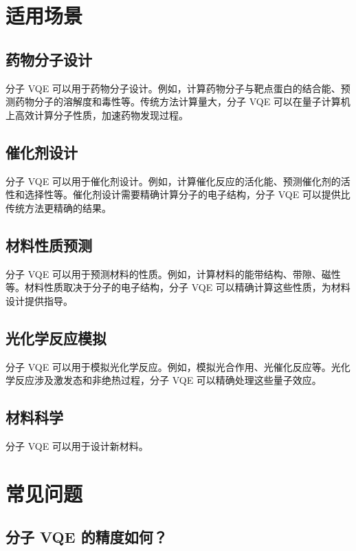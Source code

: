 \documentclass[12pt,a4paper]{article}
\begin{document}
\section{适用场景}

\subsection{药物分子设计}

分子 VQE 可以用于药物分子设计。例如，计算药物分子与靶点蛋白的结合能、预测药物分子的溶解度和毒性等。传统方法计算量大，分子 VQE 可以在量子计算机上高效计算分子性质，加速药物发现过程。

\subsection{催化剂设计}

分子 VQE 可以用于催化剂设计。例如，计算催化反应的活化能、预测催化剂的活性和选择性等。催化剂设计需要精确计算分子的电子结构，分子 VQE 可以提供比传统方法更精确的结果。

\subsection{材料性质预测}

分子 VQE 可以用于预测材料的性质。例如，计算材料的能带结构、带隙、磁性等。材料性质取决于分子的电子结构，分子 VQE 可以精确计算这些性质，为材料设计提供指导。

\subsection{光化学反应模拟}

分子 VQE 可以用于模拟光化学反应。例如，模拟光合作用、光催化反应等。光化学反应涉及激发态和非绝热过程，分子 VQE 可以精确处理这些量子效应。

\subsection{材料科学}

分子 VQE 可以用于设计新材料。

\section{常见问题}

\subsection{分子 VQE 的精度如何？}
\end{document}
